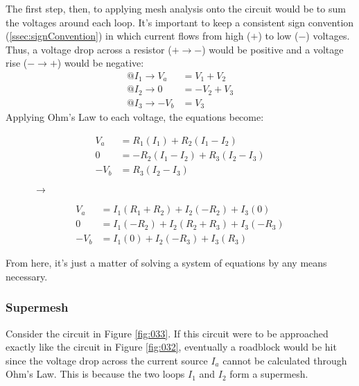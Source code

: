 \documentclass[12pt]{article}
\begin{document}
The first step, then, to applying mesh analysis onto the circuit would be to sum the voltages around each loop. It's important to keep a consistent sign convention (\ref{ssec:signConvention}) in which current flows from high ($+$) to low ($-$) voltages. Thus, a voltage drop across a resistor ($+ \rightarrow -$) would be positive and a voltage rise ($- \rightarrow +$) would be negative:
\begin{align*}
  @ I_1 \rightarrow V_a  &= V_1 + V_2 \\
  @ I_2 \rightarrow 0    &= -V_2 + V_3 \\
  @ I_3 \rightarrow -V_b &= V_3
\end{align*}
Applying Ohm's Law to each voltage, the equations become:
\begin{figure}[H]
  \vspace{-20pt}
  \begin{subfigure}[H]{0.45\textwidth}
    \centering
    \begin{align*}
      V_a  &= R_1(I_1) + R_2(I_1-I_2) \\
      0    &= -R_2(I_1-I_2) + R_3(I_2-I_3) \\
      -V_b &= R_3(I_2-I_3)
    \end{align*}
  \end{subfigure}
  $\rightarrow$
  \begin{subfigure}[H]{0.45\textwidth}
    \centering
    \begin{align*}
      V_a  &= I_1(R_1 + R_2) + I_2(-R_2) + I_3(0) \\
      0    &= I_1(-R_2) + I_2(R_2 + R_3) + I_3(-R_3) \\
      -V_b &= I_1(0) + I_2(-R_3) + I_3(R_3)
    \end{align*}
  \end{subfigure}
\end{figure}
From here, it's just a matter of solving a system of equations by any means necessary.

\subsubsection{Supermesh}
\label{sssec:supermesh}

Consider the circuit in Figure \ref{fig:033}. If this circuit were to be approached exactly like the circuit in Figure \ref{fig:032}, eventually a roadblock would be hit since the voltage drop across the current source $I_a$ cannot be calculated through Ohm's Law. This is because the two loops $I_1$ and $I_2$ form a {\color{ma} supermesh}.
\end{document}
